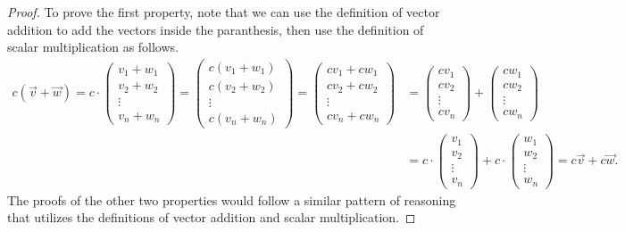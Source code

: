 \documentclass[11pt]{amsart} %
\theoremstyle{plain}
\theoremstyle{definition}
\theoremstyle{definition}
\theoremstyle{remark}
\theoremstyle{definition}
\begin{document}
\begin{proof}
      To prove the first property, note that we can use the definition of vector addition to add the vectors inside the paranthesis, then use the definition of scalar multiplication as follows.
      \begin{align*}
            c(\vec{v}+\vec{w}) = c\cdot \left( \begin{smallmatrix} v_1+w_1 \\ v_2+w_2 \\ \vdots \\ v_n+w_n \end{smallmatrix} \right)
            =\left( \begin{smallmatrix} c(v_1+w_1) \\ c(v_2+w_2) \\ \vdots \\ c(v_n+w_n) \end{smallmatrix} \right)
            =\left( \begin{smallmatrix} cv_1+cw_1 \\ cv_2+cw_2 \\ \vdots \\ cv_n+cw_n \end{smallmatrix} \right)
            &=\left( \begin{smallmatrix} cv_1 \\ cv_2 \\ \vdots \\ cv_n \end{smallmatrix} \right) + \left( \begin{smallmatrix} cw_1 \\ cw_2 \\ \vdots \\ cw_n \end{smallmatrix} \right) \\
            &=c\cdot \left( \begin{smallmatrix} v_1 \\ v_2 \\ \vdots \\ v_n \end{smallmatrix} \right) + c\cdot \left( \begin{smallmatrix} w_1 \\ w_2 \\ \vdots \\ w_n \end{smallmatrix} \right)
            =c\vec{v}+c\vec{w}.
      \end{align*}
      The proofs of the other two properties would follow a similar pattern of reasoning that utilizes the definitions of vector addition and scalar multiplication.
\end{proof}
\end{document}
